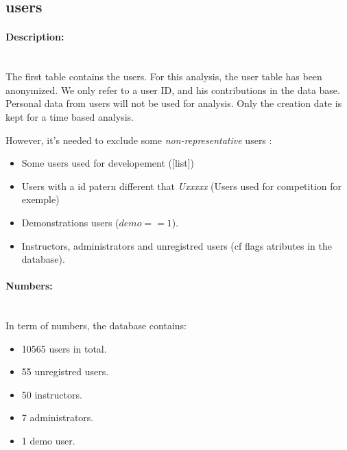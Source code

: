 \subsection{users} %
\label{sub:users}

\fboxsep=0mm%
\fboxrule=2pt%

\begin{figure}
  \vspace{-20pt}
  \begin{center}
  \end{center}
  \vspace{-20pt}
\end{figure}

\paragraph{Description:}~\\ %
The first table contains the users. For this analysis, the user table has been anonymized. We only refer to a user ID, and his contributions in the data base. Personal data from users will not be used for analysis. Only the creation date is kept for a time based analysis.  

However, it's needed to exclude some \emph{non-representative} users :

\begin{itemize}
	\setlength\itemsep{0em}
	\item Some users used for developement ([list])
	\item Users with a id patern different that \emph{Uxxxxx} (Users used for competition for exemple)
	\item Demonstrations users ($demo == 1 $).
	\item Instructors, administrators and unregistred users (cf flags atributes in the database).
\end{itemize}

\paragraph{Numbers:}~\\ %
In term of numbers, the database contains:
\begin{itemize}
	\setlength\itemsep{0em}
	\item 10565 users in total.
	\item 55 unregistred users.
	\item 50 instructors.
	\item 7 administrators.
	\item 1 demo user.
\end{itemize}

